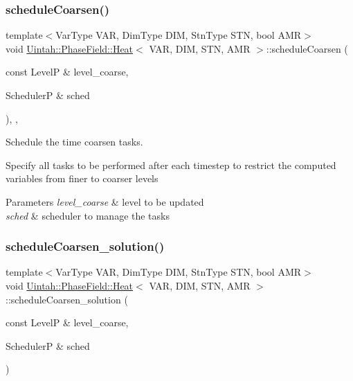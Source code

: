 \subsubsection{\texorpdfstring{schedule\+Coarsen()}{scheduleCoarsen()}}
{\footnotesize\ttfamily template$<$Var\+Type V\+AR, Dim\+Type D\+IM, Stn\+Type S\+TN, bool A\+MR$>$ \\
void \hyperlink{classUintah_1_1PhaseField_1_1Heat}{Uintah\+::\+Phase\+Field\+::\+Heat}$<$ V\+AR, D\+IM, S\+TN, A\+MR $>$\+::schedule\+Coarsen (\begin{DoxyParamCaption}\item[{const LevelP \&}]{level\+\_\+coarse,  }\item[{SchedulerP \&}]{sched }\end{DoxyParamCaption})\hspace{0.3cm}{\ttfamily [override]}, {\ttfamily [protected]}, {\ttfamily [virtual]}}



Schedule the time coarsen tasks. 

Specify all tasks to be performed after each timestep to restrict the computed variables from finer to coarser levels


\begin{DoxyParams}{Parameters}
{\em level\+\_\+coarse} & level to be updated \\
\hline
{\em sched} & scheduler to manage the tasks \\
\hline
\end{DoxyParams}
\mbox{\label{classUintah_1_1PhaseField_1_1Heat_affbdc737418eacaee32fdf7adba3a856}} 
\subsubsection{\texorpdfstring{schedule\+Coarsen\+\_\+solution()}{scheduleCoarsen\_solution()}}
{\footnotesize\ttfamily template$<$Var\+Type V\+AR, Dim\+Type D\+IM, Stn\+Type S\+TN, bool A\+MR$>$ \\
void \hyperlink{classUintah_1_1PhaseField_1_1Heat}{Uintah\+::\+Phase\+Field\+::\+Heat}$<$ V\+AR, D\+IM, S\+TN, A\+MR $>$\+::schedule\+Coarsen\+\_\+solution (\begin{DoxyParamCaption}\item[{const LevelP \&}]{level\+\_\+coarse,  }\item[{SchedulerP \&}]{sched }\end{DoxyParamCaption})\hspace{0.3cm}{\ttfamily [protected]}}



